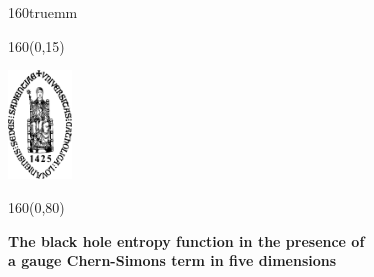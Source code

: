 \documentclass[12pt,twoside]{book}
\begin{document}
\begin{titlepage}
\thispagestyle{empty}

\setlength{\TPHorizModule}{1mm}
\setlength{\TPVertModule}{1mm}

\topmargin -10mm
\textwidth 160truemm
\oddsidemargin 0mm

\begin{textblock}{160}(0,15)
\vspace{-\parskip}
\begin{center}
\includegraphics[width=17mm]{sedes}
\end{center}
\end{textblock}
%
%
\begin{textblock}{160}(0,80)
\textblockcolour{}
\vspace{-\parskip}
\begin{center}
\fontsize{16}{18} \selectfont \sffamily\textbf{
The black hole entropy function in the presence of\\
a gauge Chern-Simons term in five dimensions}\vspace{3mm}


\end{center}
\end{textblock}
\end{titlepage}
\end{document}
